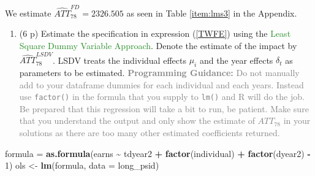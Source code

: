 \documentclass[
]{article}
\newenvironment{Shaded}{\begin{snugshade}}{\end{snugshade}}
\newcommand{\AttributeTok}[1]{\textcolor[rgb]{0.13,0.29,0.53}{#1}}
\newcommand{\DecValTok}[1]{\textcolor[rgb]{0.00,0.00,0.81}{#1}}
\newcommand{\FunctionTok}[1]{\textcolor[rgb]{0.13,0.29,0.53}{\textbf{#1}}}
\newcommand{\NormalTok}[1]{#1}
\newcommand{\OtherTok}[1]{\textcolor[rgb]{0.56,0.35,0.01}{#1}}
\newcommand{\SpecialCharTok}[1]{\textcolor[rgb]{0.81,0.36,0.00}{\textbf{#1}}}
\newcommand{\StringTok}[1]{\textcolor[rgb]{0.31,0.60,0.02}{#1}}
\providecommand{\tightlist}{%
  \setlength{\itemsep}{0pt}\setlength{\parskip}{0pt}}
\begin{document}
We estimate \(\widehat{ATT}_{78}^{FD} = 2326.505\) as seen in Table
\ref{item:lms3} in the Appendix.

\begin{enumerate}
\def\labelenumi{\arabic{enumi}.}
\setcounter{enumi}{2}
\tightlist
\item
  (6 p) Estimate the specification in expression (\ref{TWFE}) using the
  \textcolor{ForestGreen}{Least Square Dummy Variable Approach}. Denote
  the estimate of the impact by \(\widehat{ATT}_{78}^{LSDV}\). LSDV
  treats the individual effects \(\mu_i\) and the year effects
  \(\delta_t\) as parameters to be estimated.
  \textcolor{Gray}{\textbf{Programming Guidance:} Do not manually add to your dataframe dummies for each individual and each years. Instead use \texttt{factor()} in the formula that you supply to \texttt{lm()} and R will do the job. Be prepared that this regression will take a bit to run, be patient. Make sure that you understand the output and only show the estimate of ${ATT}_{78}$ in your solutions as there are too many other estimated coefficients returned.}\label{item:lsdv}
\end{enumerate}

\begin{Shaded}
\end{Shaded}

\begin{Shaded}
\begin{Highlighting}[]
\NormalTok{formula }\OtherTok{=} \FunctionTok{as.formula}\NormalTok{(earns }\SpecialCharTok{\textasciitilde{}}\NormalTok{ tdyear2 }\SpecialCharTok{+} \FunctionTok{factor}\NormalTok{(individual) }\SpecialCharTok{+} \FunctionTok{factor}\NormalTok{(dyear2) }\SpecialCharTok{{-}} \DecValTok{1}\NormalTok{)}
\NormalTok{ols }\OtherTok{\textless{}{-}} \FunctionTok{lm}\NormalTok{(formula, }\AttributeTok{data =}\NormalTok{ long\_psid)}
\end{Highlighting}
\end{Shaded}

\begin{Shaded}
\end{Shaded}
\end{document}
